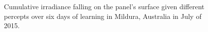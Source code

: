 \documentclass{article}
\begin{document}
{%
\begin{figure}
\begin{center}
	 \hspace{1mm}%
	 \hspace{1mm} %
\caption{Cumulative irradiance falling on the panel's surface given different percepts over six days of learning in Mildura, Australia in July of 2015.}
\label{fig:results_aus}
\end{center}
\end{figure}

}
\end{document}
